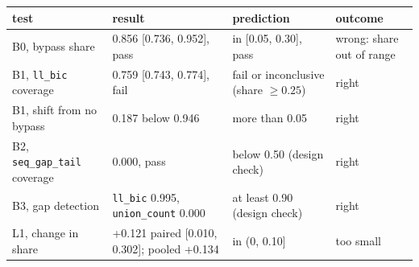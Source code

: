 \begin{tabular}{p{3.3cm}p{5.2cm}p{3.4cm}p{2.4cm}}
\toprule
test & result & prediction & outcome \\
\midrule
B0, bypass share & 0.856 [0.736, 0.952], pass & in [0.05, 0.30], pass & wrong: share out of range \\
B1, \texttt{ll\_bic} coverage & 0.759 [0.743, 0.774], fail & fail or inconclusive (share $\ge 0.25$) & right \\
B1, shift from no bypass & 0.187 below 0.946 & more than 0.05 & right \\
B2, \texttt{seq\_gap\_tail} coverage & 0.000, pass & below 0.50 (design check) & right \\
B3, gap detection & \texttt{ll\_bic} 0.995, \texttt{union\_count} 0.000 & at least 0.90 (design check) & right \\
L1, change in share & +0.121 paired [0.010, 0.302]; pooled +0.134 & in (0, 0.10] & too small \\
\bottomrule
\end{tabular}
\par{}
